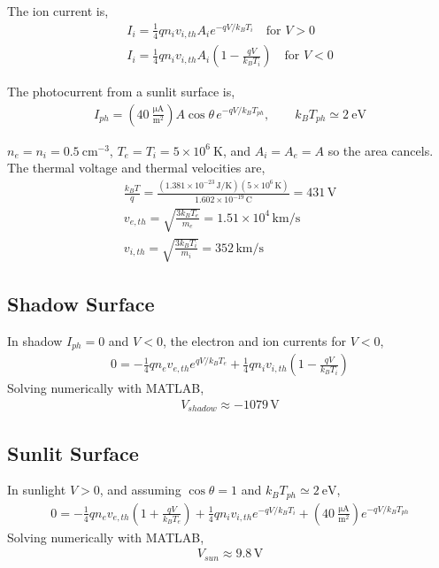 \documentclass[11pt]{article}
\begin{document}
\hspace*{2em}The ion current is,
\begin{gather*}
I_i = \frac{1}{4} q n_i v_{i,th} A_i e^{-qV/k_B T_i} \quad \text{for } V > 0 \\
I_i = \frac{1}{4} q n_i v_{i,th} A_i \left(1 - \frac{qV}{k_B T_i}\right) \quad \text{for } V < 0
\end{gather*}

\hspace*{2em}The photocurrent from a sunlit surface is,
\begin{gather*}
I_{ph} = \left(40~\mathrm{\frac{\mu A}{m^2}}\right) A\cos\theta\, e^{-qV/k_B T_{ph}}, \qquad k_B T_{ph} \simeq 2~\mathrm{eV}
\end{gather*}

\hspace*{2em}$n_e = n_i = 0.5~\mathrm{cm^{-3}}$, $T_e = T_i = 5\times10^{6}~\mathrm{K}$, and $A_i = A_e = A$ so the area cancels.
The thermal voltage and thermal velocities are,
\begin{gather*}
\frac{k_B T}{q} = \frac{(1.381\times10^{-23}\,\mathrm{J/K})(5\times10^{6}\,\mathrm{K})}{1.602\times10^{-19}\,\mathrm{C}} = 431\,\mathrm{V} \\
v_{e,th} = \sqrt{\frac{3 k_B T_e}{m_e}} = 1.51\times10^{4}\,\mathrm{km/s} \\
v_{i,th} = \sqrt{\frac{3 k_B T_i}{m_i}} = 352\,\mathrm{km/s}
\end{gather*}

\subsection*{Shadow Surface}
\hspace*{2em}In shadow $I_{ph} = 0$ and $V < 0$, the electron and ion currents for $V<0$,
\begin{gather*}
0 = -\frac{1}{4} q n_e v_{e,th} e^{qV/k_B T_e} + \frac{1}{4} q n_i v_{i,th}\left(1 - \frac{qV}{k_B T_i}\right)
\end{gather*}
\hspace*{2em}Solving numerically with MATLAB,
\begin{gather*}
\boxed{V_{shadow} \approx -1079\,\mathrm{V}}
\end{gather*}

\subsection*{Sunlit Surface}
\hspace*{2em}In sunlight $V > 0$, and assuming $\cos\theta = 1$ and $k_B T_{ph} \simeq 2~\mathrm{eV}$,
\begin{gather*}
0 = -\frac{1}{4} q n_e v_{e,th}\left(1 + \frac{qV}{k_B T_e}\right) + \frac{1}{4} q n_i v_{i,th} e^{-qV/k_B T_i} + \left(40~\mathrm{\frac{\mu A}{m^2}}\right) e^{-qV/k_B T_{ph}}
\end{gather*}
\hspace*{2em}Solving numerically with MATLAB,
\begin{gather*}
\boxed{V_{sun} \approx 9.8\,\mathrm{V}}
\end{gather*}
\end{document}
